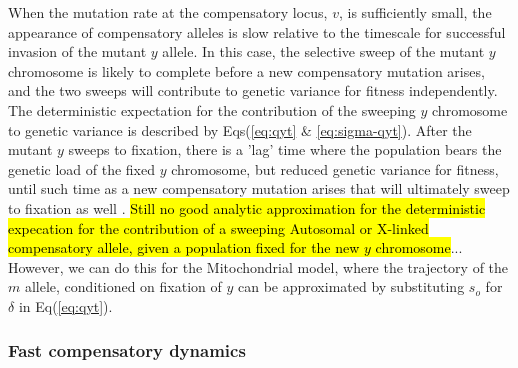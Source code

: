 \documentclass{article}
\begin{document}
When the mutation rate at the compensatory locus, $v$, is sufficiently small, the appearance of compensatory alleles is slow relative to the timescale for successful invasion of the mutant $y$ allele. In this case, the selective sweep of the mutant $y$ chromosome is likely to complete before a new compensatory mutation arises, and the two sweeps will contribute to genetic variance for fitness independently. The deterministic expectation for the contribution of the sweeping $y$ chromosome to genetic variance is described by Eqs(\ref{eq:qyt} \& \ref{eq:sigma-qyt}). After the mutant $y$ sweeps to fixation, there is a 'lag' time where the population bears the genetic load of the fixed $y$ chromosome, but reduced genetic variance for fitness, until such time as a new compensatory mutation arises that will ultimately sweep to fixation as well \citep{ConnallonDowling2017}. \hl{Still no good analytic approximation for the deterministic expecation for the contribution of a sweeping Autosomal or X-linked compensatory allele, given a population fixed for the new $y$ chromosome}... However, we can do this for the Mitochondrial model, where the trajectory of the $m$ allele, conditioned on fixation of $y$ can be approximated by substituting $s_o$ for $\delta$ in Eq(\ref{eq:qyt}).


\subsubsection*{Fast compensatory dynamics} 
\end{document}
